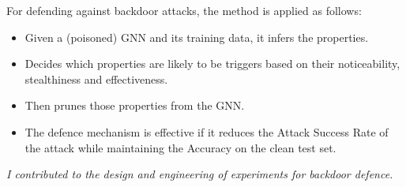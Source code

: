 \documentclass[english,report,10pt]{extarticle}
\begin{document}
For defending against backdoor attacks, the method is applied as follows:
\begin{itemize}
    \item Given a (poisoned) GNN and its training data, it infers the properties.
    \item Decides which properties are likely to be triggers based on their noticeability, stealthiness and effectiveness.
    \item Then prunes those properties from the GNN.
    \item The defence mechanism is effective if it reduces the Attack Success Rate of the attack while maintaining the Accuracy on the clean test set.
\end{itemize}

\textit{I contributed to the design and engineering of experiments for backdoor defence.}
\end{document}
